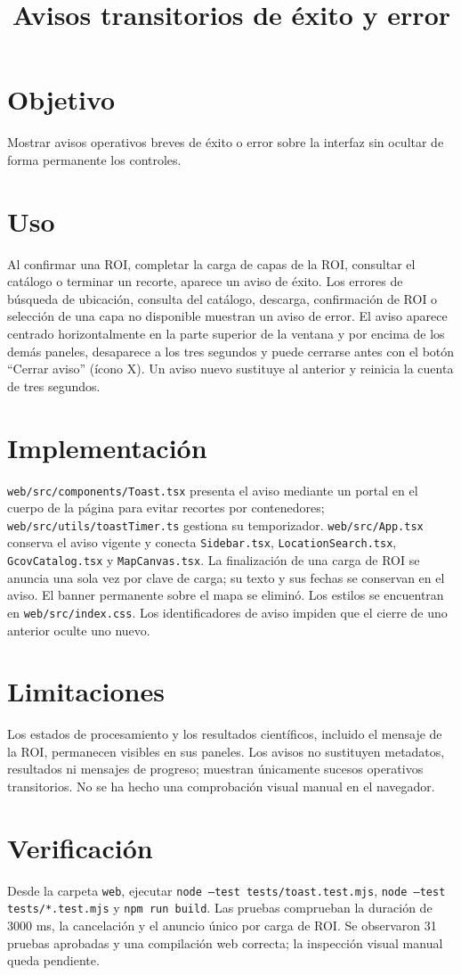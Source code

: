 \documentclass[11pt]{article}
\begin{document}
\title{Avisos transitorios de éxito y error}
\maketitle

\section{Objetivo}
Mostrar avisos operativos breves de éxito o error sobre la interfaz sin ocultar de forma permanente los controles.

\section{Uso}
Al confirmar una ROI, completar la carga de capas de la ROI, consultar el catálogo o terminar un recorte, aparece un aviso de éxito. Los errores de búsqueda de ubicación, consulta del catálogo, descarga, confirmación de ROI o selección de una capa no disponible muestran un aviso de error. El aviso aparece centrado horizontalmente en la parte superior de la ventana y por encima de los demás paneles, desaparece a los tres segundos y puede cerrarse antes con el botón ``Cerrar aviso'' (ícono X). Un aviso nuevo sustituye al anterior y reinicia la cuenta de tres segundos.

\section{Implementación}
\texttt{web/src/components/Toast.tsx} presenta el aviso mediante un portal en el cuerpo de la página para evitar recortes por contenedores; \texttt{web/src/utils/toastTimer.ts} gestiona su temporizador. \texttt{web/src/App.tsx} conserva el aviso vigente y conecta \texttt{Sidebar.tsx}, \texttt{LocationSearch.tsx}, \texttt{GcovCatalog.tsx} y \texttt{MapCanvas.tsx}. La finalización de una carga de ROI se anuncia una sola vez por clave de carga; su texto y sus fechas se conservan en el aviso. El banner permanente sobre el mapa se eliminó. Los estilos se encuentran en \texttt{web/src/index.css}. Los identificadores de aviso impiden que el cierre de uno anterior oculte uno nuevo.

\section{Limitaciones}
Los estados de procesamiento y los resultados científicos, incluido el mensaje de la ROI, permanecen visibles en sus paneles. Los avisos no sustituyen metadatos, resultados ni mensajes de progreso; muestran únicamente sucesos operativos transitorios. No se ha hecho una comprobación visual manual en el navegador.

\section{Verificación}
Desde la carpeta \texttt{web}, ejecutar \texttt{node --test tests/toast.test.mjs}, \texttt{node --test tests/*.test.mjs} y \texttt{npm run build}. Las pruebas comprueban la duración de 3000 ms, la cancelación y el anuncio único por carga de ROI. Se observaron 31 pruebas aprobadas y una compilación web correcta; la inspección visual manual queda pendiente.
\end{document}
